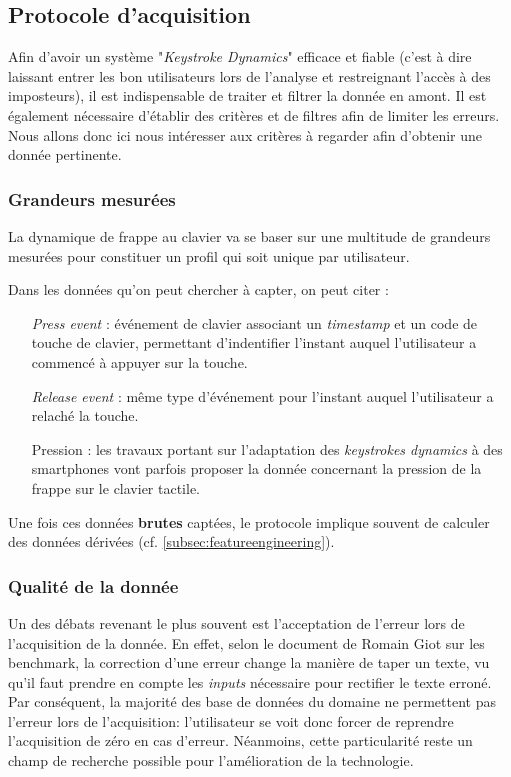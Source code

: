 \subsection{Protocole d'acquisition}

Afin d'avoir un système "\textit{Keystroke Dynamics}" efficace et fiable (c'est à dire laissant entrer les bon utilisateurs lors de l'analyse et restreignant l'accès à des imposteurs), il est indispensable de traiter et filtrer la donnée en amont. Il est également nécessaire d'établir des critères et de filtres afin de  limiter les erreurs. Nous allons donc ici nous intéresser aux critères à regarder afin d'obtenir une donnée pertinente.

\subsubsection{Grandeurs mesurées}
La dynamique de frappe au clavier va se baser sur une multitude de grandeurs mesurées pour constituer un profil qui soit unique par utilisateur\cite{giotThese,Hu2008,gunetti2005,bergadano2002}.

Dans les données qu'on peut chercher à capter, on peut citer :

\begin{itemize}
	\item[\textit{Press event}] : événement de clavier associant un \textit{timestamp} et un code de touche de clavier, permettant d'indentifier l'instant auquel l'utilisateur a commencé à appuyer sur la touche.
	\item[\textit{Release event}] : même type d'événement pour l'instant auquel l'utilisateur a relaché la touche.
	\item[Pression] : les travaux portant sur l'adaptation des \textit{keystrokes dynamics} à des smartphones vont parfois proposer la donnée concernant la pression de la frappe sur le clavier tactile.
\end{itemize}

Une fois ces données \textbf{brutes} captées, le protocole implique souvent de calculer des données dérivées (cf. \ref{subsec:featureengineering}).

\subsubsection{Qualité de la donnée}

Un des débats revenant le plus souvent est l'acceptation de l'erreur lors de l'acquisition de la donnée. En effet, selon le document de Romain Giot sur les benchmark\cite{giotBenchmark}, la correction d'une erreur change la manière de taper un texte, vu qu'il faut  prendre en compte les \textit{inputs} nécessaire pour rectifier le texte erroné. Par conséquent, la majorité des base de données du domaine ne permettent pas l'erreur lors de l'acquisition: l'utilisateur se voit donc forcer de reprendre l'acquisition de zéro en cas d'erreur. Néanmoins, cette particularité reste un champ de recherche possible pour l'amélioration de la technologie.\\

